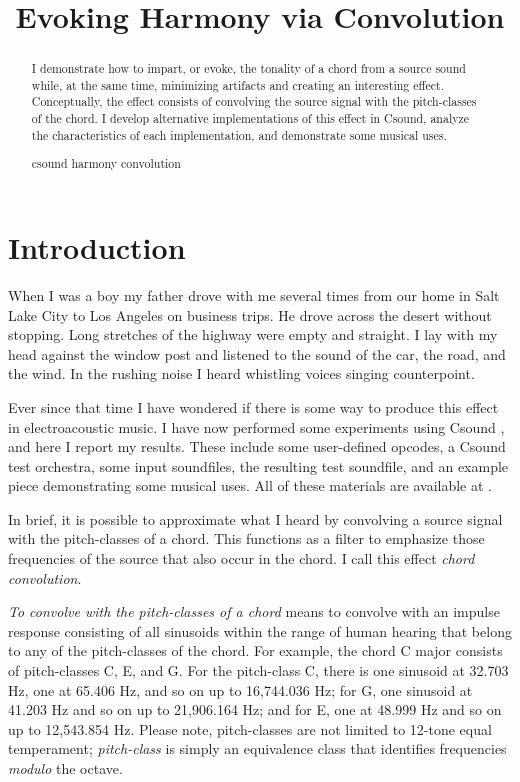 \documentclass[runningheads,a4paper]{llncs}
\newcommand{\keywords}[1]{\par\addvspace\baselineskip
\noindent\keywordname\enspace\ignorespaces#1}
\begin{document}
\mainmatter

\title{Evoking Harmony via Convolution}
\author{\submissionauthor}
\authorrunning{\submissionauthorrunning}
\institute{\submissioninstitute}

\maketitle

\begin{abstract}
I demonstrate how to impart, or evoke, the tonality of a chord from a source 
sound while, at the same time, minimizing artifacts and creating an 
interesting effect. Conceptually, the effect consists of convolving the 
source signal with the pitch-classes of the chord. I develop alternative 
implementations of this effect in Csound, analyze the characteristics of each 
implementation, and demonstrate some musical uses.
\keywords{csound harmony convolution}
\end{abstract}

\section{Introduction}

When I was a boy my father drove with me several times from our home in Salt 
Lake City to Los Angeles on business trips. He drove across the desert without 
stopping. Long stretches of the highway were empty and straight. I lay with my 
head against the window post and listened to the sound of the car, the road, 
and the wind. In the rushing noise I heard whistling voices singing 
counterpoint.

Ever since that time I have wondered if there is some way to produce this 
effect in electroacoustic music. I have now performed some experiments using 
Csound \cite{csound_home}, and here I report my results. These include some 
user-defined opcodes, a Csound test orchestra, some input soundfiles, the 
resulting test soundfile, and an example piece demonstrating some musical 
uses. All of these materials are available at \submissionmaterialsrepo.

In brief, it is possible to approximate what I heard by convolving a source 
signal with the pitch-classes of a chord. This functions as a filter to 
emphasize those frequencies of the source that also occur in the chord. I call 
this effect \emph{chord convolution}.

\emph{To convolve with the pitch-classes of a chord} means to convolve with an 
impulse response consisting of all sinusoids within the range of human 
hearing that belong to any of the pitch-classes of the chord. For example, the 
chord C major consists of pitch-classes C, E, and G. For the pitch-class C, 
there is one sinusoid at 32.703 Hz, one at 65.406 Hz, and so on up to 
16,744.036 Hz; for G, one sinusoid at 41.203 Hz and so on up to 21,906.164 Hz; 
and for E, one at 48.999 Hz and so on up to 12,543.854 Hz. Please note, 
pitch-classes are not limited to 12-tone equal temperament; \emph{pitch-class} 
is simply an equivalence class that identifies frequencies \emph{modulo} the 
octave. 
\end{document}
